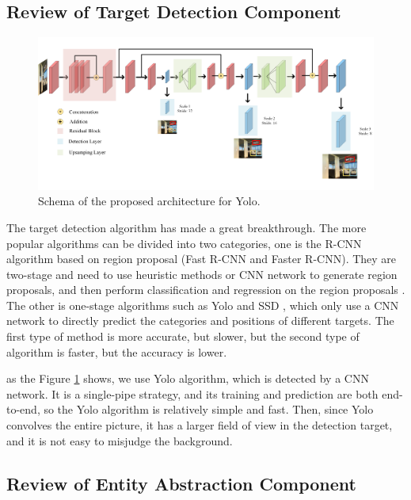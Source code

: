 \subsection{Review of Target Detection Component}

\begin{figure}[h]
	\centering
	\includegraphics[scale=1]{image04.png}
	\caption{Schema of the proposed architecture for Yolo.}
	\label{image04}
\end{figure}
\vspace{-1em}
The target detection algorithm has made a great breakthrough. The more popular algorithms can be divided into two categories, one is the R-CNN algorithm based on region proposal (Fast R-CNN and Faster R-CNN). They are two-stage and need to use heuristic methods or CNN network to generate region proposals, and then perform classification and regression on the region proposals \cite{mao2019mini,girshick2015fast}. The other is one-stage algorithms such as Yolo and SSD , which only use a CNN network to directly predict the categories and positions of different targets. The first type of method is more accurate, but slower, but the second type of algorithm is faster, but the accuracy is lower.
	
as the Figure \ref{image04} shows, we use Yolo algorithm, which is detected by a CNN network. It is a single-pipe strategy, and its training and prediction are both end-to-end, so the Yolo algorithm is relatively simple and fast. Then, since Yolo convolves the entire picture, it has a larger field of view in the detection target, and it is not easy to misjudge the background.
\vspace{-1em}
\subsection{Review of Entity Abstraction Component}
	
